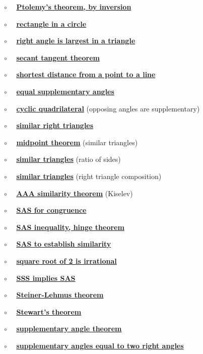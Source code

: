 \documentclass[11pt, oneside]{article}
\begin{document}
$\circ$ \ \ \hyperref[sec:Ptolemy_inversion]{\textbf{Ptolemy's theorem, by inversion}}

$\circ$ \ \ \hyperref[sec:rectangle_side_on_a_circle]{\textbf{rectangle in a circle}}

$\circ$ \ \ \hyperref[sec:right_angle_largest]{\textbf{right angle is largest in a triangle}}

$\circ$ \ \ \hyperref[sec:secant_tangent_theorem]{\textbf{secant tangent theorem}}

$\circ$ \ \ \hyperref[sec:shortest_distance_to_line]{\textbf{shortest distance from a point to a line}}

$\circ$ \ \ \hyperref[sec:equal_supplementary_angles]{\textbf{equal supplementary angles}}

$\circ$ \ \ \hyperref[sec:quadrilateral_supplementary]{\textbf{cyclic quadrilateral}} (opposing angles are supplementary)

$\circ$ \ \ \hyperref[sec:similar_right_triangles]{\textbf{similar right triangles}}

$\circ$ \ \ \hyperref[sec:midpoint_theorem]{\textbf{midpoint theorem}} (similar triangles)

$\circ$ \ \  \hyperref[sec:similarity_equal_ratios]{\textbf{similar triangles}} (ratio of sides)

$\circ$ \ \  \hyperref[sec:similarity_right_to_all_triangles]{\textbf{similar triangles}} (right triangle composition)

$\circ$ \ \ \hyperref[sec:similarity_theorem]{\textbf{AAA similarity theorem}} (Kiselev)

$\circ$ \ \ \hyperref[sec:SAS]{\textbf{SAS for congruence}}

$\circ$ \ \ \hyperref[sec:hinge_theorem]{\textbf{SAS inequality, hinge theorem}}

$\circ$ \ \ \hyperref[sec:SAS_similar]{\textbf{SAS to establish similarity}}

$\circ$ \ \ \hyperref[sec:sqrt_two]{\textbf{square root of 2 is irrational}}

$\circ$ \ \ \hyperref[sec:SSS_implies_SAS]{\textbf{SSS implies SAS}}

$\circ$ \ \ \hyperref[sec:Steiner_Lehmus_Theorem]{\textbf{Steiner-Lehmus theorem}}

$\circ$ \ \ \hyperref[sec:Stewarts_theorem]{\textbf{Stewart's theorem}}

$\circ$ \ \ \hyperref[sec:supplementary_angle_theorem]{\textbf{supplementary angle theorem}}

$\circ$ \ \ \hyperref[sec:two_supplementary_equal_two_right]{\textbf{supplementary angles equal to two right angles}}
\end{document}
